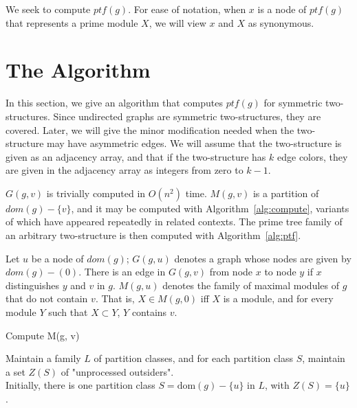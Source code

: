 We seek to compute $ptf(g)$.
For ease of notation, when $x$ is a node of $ptf(g)$ that represents a prime module $X$, we will view $x$ and $X$ as synonymous.


\section{The Algorithm}\label{sec:the-algorithm}

In this section, we give an algorithm that computes $ptf(g)$ for symmetric two-structures.
Since undirected graphs are symmetric two-structures, they are covered.
Later, we will give the minor modification needed when the two-structure may have asymmetric edges.
We will assume that the two-structure is given as an adjacency array, and that if the two-structure has $k$ edge colors, they are given in the adjacency array as integers from zero to $k-1$.

$G(g, v)$ is trivially computed in $O(n^2)$ time. $M(g, v)$ is a partition of $dom(g) - \{v\}$, and it may be computed with Algorithm~\ref{alg:compute}, variants of which have appeared repeatedly in related contexts.
The prime tree family of an arbitrary two-structure is then computed with Algorithm~\ref{alg:ptf}.


\begin{mydef}
    \label{def:3-1}
    Let $u$ be a node of $dom(g)$; $G(g, u)$ denotes a graph whose nodes are given by $dom(g) - (0)$.
    There is an edge in $G(g, v)$ from node $x$ to node $y$ if $x$ distinguishes $y$ and $v$ in $g$.
    $M(g,u)$ denotes the family of maximal modules of $g$ that do not contain $v$.
    That is, $X \in M(g, 0)$ iff $X$ is a module, and for every module $Y$ such that $X \subset Y$, $Y$ contains $v$.
\end{mydef}


\begin{algorithm}[H]
    \label{alg:compute}
    \SetAlgoLined
    \caption{Compute M(g, v)}
    Maintain a family $L$ of partition classes, and for each partition class $S$, maintain a set $Z(S)$ of "unprocessed outsiders".\\
    Initially, there is one partition class $S = \text{dom}(g) - \{u\}$ in $L$, with $Z(S) = \{u\}$.

\end{algorithm}


